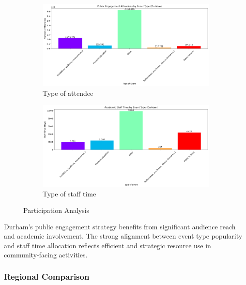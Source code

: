 \documentclass[journal,onecolumn, 10pt,draftclsnofoot]{IEEEtran}
\begin{document}
\begin{figure}[h]
\centering
\begin{subfigure}[b]{0.48\textwidth}
    \centering
    \includegraphics[width=\textwidth]{Fig/figure32.attendees_by_type.png}
    \caption{Type of attendee}
    \label{fig:attendees-by-type}
\end{subfigure}
\hfill
\begin{subfigure}[b]{0.48\textwidth}
    \centering
    \includegraphics[width=\textwidth]{Fig/figure33.staff_time_by_type.png}
    \caption{Type of staff time}
    \label{fig:staff-time-by-type}
\end{subfigure}
\vspace{0.6cm}
\caption{Participation Analysis}
\label{fig:participation-analysis}
\end{figure}

Durham's public engagement strategy benefits from significant audience reach and academic involvement. The strong alignment between event type popularity and staff time allocation reflects efficient and strategic resource use in community-facing activities.

\subsubsection{Regional Comparison}
\end{document}
